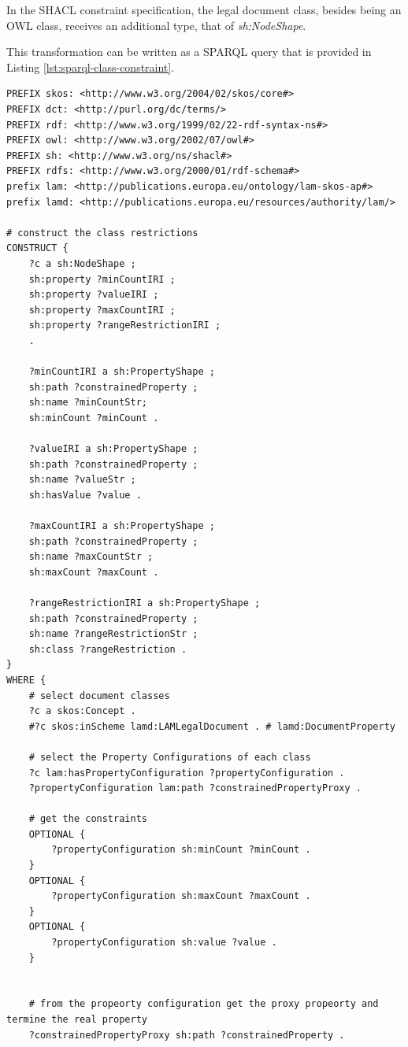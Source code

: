 	In the SHACL constraint specification, the legal document class, besides being an OWL class, receives an additional type, that of \textit{sh:NodeShape}. 
	
	This transformation can be written as a SPARQL query that is provided in Listing \ref{lst:sparql-class-constraint}. 

	\begin{lstlisting}[language=SPARQL, captionpos=b, caption={The transformation SPARQL query for LAM legal document class restrictions}, label=lst:sparql-class-constraint]	
PREFIX skos: <http://www.w3.org/2004/02/skos/core#>
PREFIX dct: <http://purl.org/dc/terms/>
PREFIX rdf: <http://www.w3.org/1999/02/22-rdf-syntax-ns#>
PREFIX owl: <http://www.w3.org/2002/07/owl#>
PREFIX sh: <http://www.w3.org/ns/shacl#>
PREFIX rdfs: <http://www.w3.org/2000/01/rdf-schema#>
prefix lam: <http://publications.europa.eu/ontology/lam-skos-ap#>
prefix lamd: <http://publications.europa.eu/resources/authority/lam/>

# construct the class restrictions
CONSTRUCT { 
	?c a sh:NodeShape ;
	sh:property ?minCountIRI ;
	sh:property ?valueIRI ;
	sh:property ?maxCountIRI ;
	sh:property ?rangeRestrictionIRI ;
	.
	
	?minCountIRI a sh:PropertyShape ;
	sh:path ?constrainedProperty ;    
	sh:name ?minCountStr;
	sh:minCount ?minCount .
	
	?valueIRI a sh:PropertyShape ;
	sh:path ?constrainedProperty ;
	sh:name ?valueStr ;
	sh:hasValue ?value .
	
	?maxCountIRI a sh:PropertyShape ;
	sh:path ?constrainedProperty ;
	sh:name ?maxCountStr ;
	sh:maxCount ?maxCount .
	
	?rangeRestrictionIRI a sh:PropertyShape ;
	sh:path ?constrainedProperty ;	
	sh:name ?rangeRestrictionStr ;
	sh:class ?rangeRestriction .
} 
WHERE { 
	# select document classes
	?c a skos:Concept . 
	#?c skos:inScheme lamd:LAMLegalDocument . # lamd:DocumentProperty  
	
	# select the Property Configurations of each class
	?c lam:hasPropertyConfiguration ?propertyConfiguration .  
	?propertyConfiguration lam:path ?constrainedPropertyProxy .
	
	# get the constraints
	OPTIONAL {
		?propertyConfiguration sh:minCount ?minCount .
	}
	OPTIONAL {
		?propertyConfiguration sh:maxCount ?maxCount .
	}
	OPTIONAL {
		?propertyConfiguration sh:value ?value .
	}
	
	
	# from the propeorty configuration get the proxy propeorty and termine the real property
	?constrainedPropertyProxy sh:path ?constrainedProperty .  
	

\end{lstlisting}
